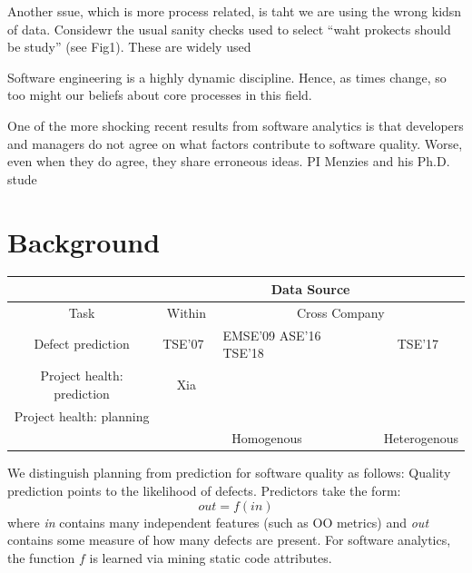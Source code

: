  Another ssue, which is more process related, is taht we are using the wrong kidsn of data. Considewr the usual sanity checks used to select ``waht prokects should be study'' (see Fig1). These are widely used

 Software engineering is a highly dynamic discipline. Hence, as times change, so too might our beliefs about core processes in this field.
 
  One of the more shocking recent results from
  software analytics is that developers
  and managers do not agree on what factors
  contribute to software quality. Worse,
  even when they do agree, they share erroneous ideas. PI Menzies and his Ph.D. stude
  
  
\section{Background}

{\footnotesize \begin{tabular}{|c|c|p{3cm}|c|}\cline{2-4}
\multicolumn{1}{c}{~}& \multicolumn{3}{|c|}{Data Source}\\\hline
Task                           & Within & \multicolumn{2}{|c|}{Cross Company} \\\hline
Defect prediction   & TSE'07~\cite{menzies07} &
EMSE'09\cite{turhan09}\newline
ASE'16~\cite{KrishnaMF16}\newline
TSE'18~\cite{krishna17b}
& TSE'17~\cite{fu18}\\\hline
Project health: prediction & Xia & \cellcolor{red!20}{This work: partA}&\cellcolor{green!10}{PartA, extension}\\\hline

Project health: planning &   & \cellcolor{cyan!20}{This work: partB}&\cellcolor{orange!10}{PartB, extension}\\\hline
\multicolumn{1}{c}{~}& \multicolumn{2}{|c|}{Homogenous}&Heterogenous\\\cline{2-4}
\end{tabular}}


We distinguish planning from prediction for software quality as follows: 
Quality prediction points to the likelihood of defects. Predictors take the form:
\begin{equation*}
  out = f(in)  
\end{equation*}
where {\em in} contains many independent features (such as OO metrics) and {\em out} contains some measure of
how many defects are present. For software analytics, the function $f$ is learned via mining static code attributes.
 


